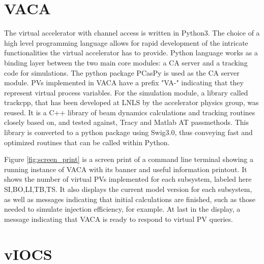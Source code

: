 \documentclass[a4paper,
              ]{jacow}
\begin{document}
\section{VACA}

The virtual accelerator with channel access is written in Python3.
The choice of a high level programming language allows for rapid development of the intricate functionalities the virtual accelerator has to provide.
Python language works as a binding layer between the two main core modules: a CA server and a tracking code for simulations.
The python package PCasPy\cite{pcaspy} is used as the CA server module.
PVs implemented in VACA have a prefix "VA-" indicating that they represent virtual process variables.
For the simulation module, a library called trackcpp\cite{trackcpp}, that has been developed at LNLS by the accelerator physics group, was reused.
It is a C++ library of beam dynamics calculations and tracking routines closely based on, and tested against, Tracy\cite{tracy} and Matlab AT\cite{at} passmethods.
This library is converted to a python package using Swig3.0\cite{swig}, thus conveying fast and optimized routines that can be called within Python.

Figure \ref{fig:screen_print} is a screen print of a command line terminal showing a running instance of VACA with its banner
and useful information printout.
It shows the number of virtual PVs implemented for each subsystem, labeled here SI,BO,LI,TB,TS.
It also displays the current model version for each subsystem, as well as messages indicating that initial calculations are finished,
such as those needed to simulate injection efficiency, for example.
At last in the display, a message indicating that VACA is ready to respond to virtual PV queries.


\section{vIOCS}
\end{document}
